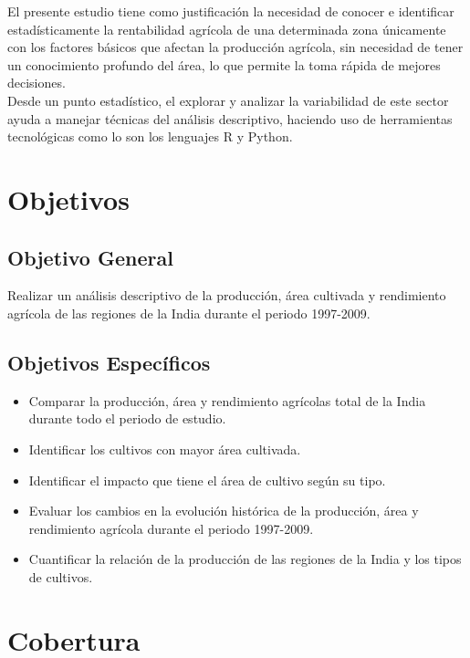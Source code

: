 \documentclass[oneside,11pt]{Latex/Classes/PhDthesisPSnPDF}
\begin{document}
El presente estudio tiene como justificación la necesidad de conocer e
identificar estadísticamente la rentabilidad agrícola de una determinada
zona únicamente con los factores básicos que afectan la producción
agrícola, sin necesidad de tener un conocimiento profundo del área, lo
que permite la toma rápida de mejores decisiones.\\

Desde un punto estadístico, el explorar y analizar la variabilidad de
este sector ayuda a manejar técnicas del análisis descriptivo, haciendo
uso de herramientas tecnológicas como lo son los lenguajes R y Python.

\section{Objetivos}

\subsection{Objetivo General}

Realizar un análisis descriptivo de la producción, área cultivada y
rendimiento agrícola de las regiones de la India durante el periodo
1997-2009.

\subsection{Objetivos Específicos}

\begin{itemize}
  \item{Comparar la producción, área y rendimiento agrícolas total de la India durante todo el periodo de estudio.}
  \item{Identificar los cultivos con mayor área cultivada.}
  \item{Identificar el impacto que tiene el área de cultivo según su tipo.}
  \item{Evaluar los cambios en la evolución histórica de la producción, área y rendimiento agrícola durante el periodo 1997-2009.}
  \item{Cuantificar la relación de la producción de las regiones de la India y los tipos de cultivos.}
\end{itemize}

\section{Cobertura}
\end{document}
